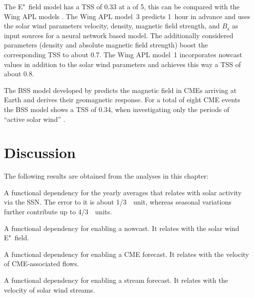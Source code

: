 The E"~field model has a TSS of 0.33 at a \Kp{} of 5, this can be compared with the Wing APL models \citep[Fig.~13]{Wing2005}. The Wing APL model~3 predicts \Kp{} 1~hour in advance and uses the solar wind parameters velocity, density, magnetic field strength, and $B_\text{z}$ as input sources for a neural network based model. The additionally considered parameters (density and absolute magnetic field strength) boost the corresponding TSS to about 0.7. The Wing APL model~1 incorporates \Kp{} nowcast values in addition to the solar wind parameters and achieves this way a TSS of about 0.8.

The BSS model developed by \citet{Savani2015,Savani2017} predicts the magnetic field in CMEs arriving at Earth and derives their geomagnetic response. For a total of eight CME events the BSS model shows a TSS of 0.34, when investigating only the periods of ``active solar wind'' \citep[Tab.~3]{Savani2017}.



\section{Discussion}
The following results are obtained from the \Kp{} analyses in this chapter:
\begin{itemize*}
	\item A functional dependency for the yearly \Kp{} averages that relates \Kp{} with solar activity via the SSN. The error to it is about 1/3~\Kp{}~unit, whereas seasonal variations further contribute up to 4/3~\Kp{}~units.
	\item A functional dependency for enabling a \Kp{} nowcast. It relates \Kp{} with the solar wind E"~field.
	\item A functional dependency for enabling a CME forecast. It relates \Kp{} with the velocity of CME-associated flows.
	\item A functional dependency for enabling a stream forecast. It relates \Kp{} with the velocity of solar wind streams.
\end{itemize*}


